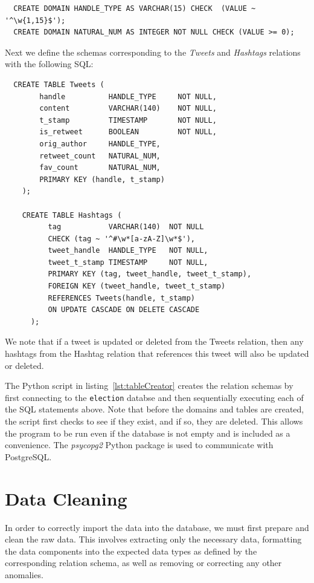 \documentclass[a4paper, 12pt]{report}
\begin{document}
\begin{verbatim}
  CREATE DOMAIN HANDLE_TYPE AS VARCHAR(15) CHECK  (VALUE ~ '^\w{1,15}$');
  CREATE DOMAIN NATURAL_NUM AS INTEGER NOT NULL CHECK (VALUE >= 0);
\end{verbatim}

Next we define the schemas corresponding to the \textit{Tweets} and \textit{Hashtags} relations with the following SQL:

\begin{verbatim}
  CREATE TABLE Tweets (
        handle          HANDLE_TYPE     NOT NULL,
        content         VARCHAR(140)    NOT NULL,
        t_stamp         TIMESTAMP       NOT NULL,
        is_retweet      BOOLEAN         NOT NULL,
        orig_author     HANDLE_TYPE,
        retweet_count   NATURAL_NUM,
        fav_count       NATURAL_NUM,
        PRIMARY KEY (handle, t_stamp)
    );

    CREATE TABLE Hashtags (
          tag           VARCHAR(140)  NOT NULL
          CHECK (tag ~ '^#\w*[a-zA-Z]\w*$'),
          tweet_handle  HANDLE_TYPE   NOT NULL,
          tweet_t_stamp TIMESTAMP     NOT NULL,
          PRIMARY KEY (tag, tweet_handle, tweet_t_stamp),
          FOREIGN KEY (tweet_handle, tweet_t_stamp)
          REFERENCES Tweets(handle, t_stamp)
          ON UPDATE CASCADE ON DELETE CASCADE
      );
\end{verbatim}

We note that if a tweet is updated or deleted from the Tweets relation, then any hashtags from the Hashtag relation that references this tweet will also be updated or deleted.

The Python script in listing~\ref{lst:tableCreator} creates the relation schemas by first connecting to the \texttt{election} databse and then sequentially executing each of the SQL statements above. Note that before the domains and tables are created, the script first checks to see if they exist, and if so, they are deleted. This allows the program to be run even if the database is not empty and is included as a convenience. The \textit{psycopg2} Python package is used to communicate with PostgreSQL.


\label{lst:tableCreator}

\newpage
\section{Data Cleaning}
\label{sec:dataCleaning}
In order to correctly import the data into the database, we must first prepare and clean the raw data. This involves extracting only the necessary data, formatting the data components into the expected data types as defined by the corresponding relation schema, as well as removing or correcting any other anomalies.
\end{document}

